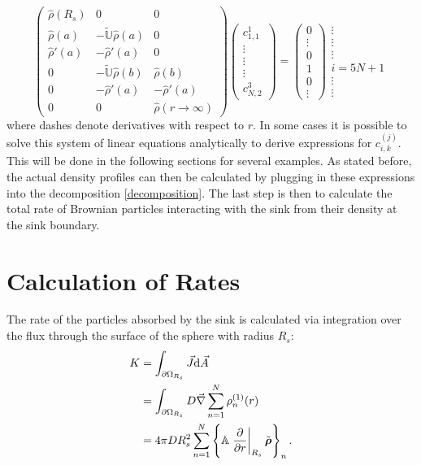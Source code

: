\begin{equation}
    \left( \begin{array}{ccc}
        \hat{\rho}(R_s) & 0 & 0 \\
        \hat{\rho}(a)   & -\tilde{\mathbb{U}}\hat{\rho}(a) & 0 \\
        \hat{\rho}'(a) & -\hat{\rho}'(a) & 0 \\
        0 &  -\tilde{\mathbb{U}}\hat{\rho}(b) & \hat{\rho}(b) \\
        0 &  -\hat{\rho}'(a) & - \hat{\rho}'(a) \\
        0 & 0 & \hat{\rho}(r\rightarrow \infty)
    \end{array}\right) \left( \begin{array}{c} c_{1,1}^{1} \\ \vdots \\ \vdots \\ \vdots \\ c_{N,2}^{3} \end{array} \right) = 
    \left( \begin{array}{c} 0 \\ \vdots \\ 0 \\ 1 \\ 0 \\ \vdots \end{array} \right) \begin{array}{c} \vdots \\ \vdots \\ \vdots \\ i = 5N+1 \\ \vdots \\ \vdots \end{array}
    \label{lgs}
\end{equation}
where dashes denote derivatives with respect to $r$. In some cases it is possible to solve this system of linear equations analytically to derive expressions for $c_{i,k}^{(j)}$. \\ 
This will be done in the following sections for several examples. As stated before, the actual density profiles can then be calculated by plugging in these expressions into the decomposition \eqref{decomposition}. The last step is then to calculate the total rate of Brownian particles interacting with the sink from their density at the sink boundary.
\section{Calculation of Rates}
\label{Calculation_of_Rates}
The rate of the particles absorbed by the sink is calculated via integration over the flux through the surface of the sphere with radius $R_s$:
\begin{align}
    K   &= \int_{\partial \Omega_{R_s}} \vec{J} {\rm d} \vec{A}\nonumber\\
    &= \int_{\partial \Omega_{R_s}} D \vec{\nabla} \sum_{n=1}^{N} \rho_n^{(1)}(r)\nonumber \\
    &= 4 \pi D R_s^{2} \sum_{n=1}^{N} \left\{ \mathbb{A} \left. \frac{\partial}{ \partial r}\right|_{R_s} \tilde{\boldsymbol{\mathbf{\rho}}} \right\}_n.
    \label{Rate}
\end{align}

